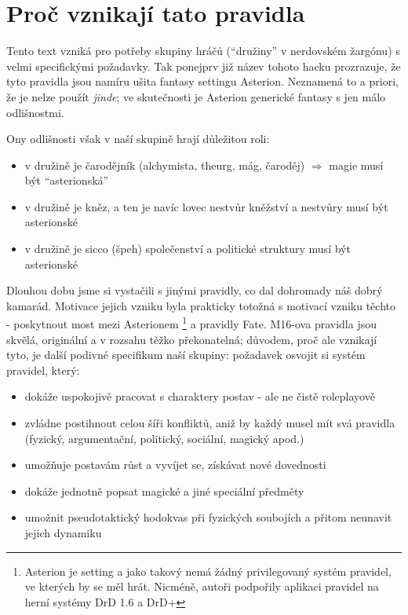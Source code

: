 \documentclass[../main.tex]{subfiles}
\begin{document}
\section{Proč vznikají tato pravidla}
\label{sec:proc-pravidla}


Tento text vzniká pro potřeby skupiny hráčů (``družiny'' v nerdovském žargónu) s velmi specifickými požadavky. Tak ponejprv již název tohoto hacku prozrazuje, že tyto pravidla jsou namíru ušita fantasy settingu Asterion. Neznamená to a priori, že je nelze použít \textit{jinde}; ve skutečnosti je Asterion generické fantasy s jen málo odlišnostmi. 

Ony odlišnosti však v naší skupině hrají důležitou roli:

\begin{itemize}
\item v družině je čarodějník (alchymista, theurg, mág, čaroděj) $\Rightarrow$ magie musí být ``asterionská''
\item v družině je kněz, a ten je navíc lovec nestvůr \Rightarrow kněžství a nestvůry musí být asterionské
\item v družině je sicco (špeh) \Rightarrow společenství a politické struktury musí být asterionské
\end{itemize}

Dlouhou dobu jsme si vystačili s jinými pravidly, co dal dohromady náš dobrý kamarád. Motivace jejich vzniku byla prakticky totožná s motivací vzniku těchto - poskytnout most mezi Asterionem \footnote{Asterion je setting a jako takový nemá žádný privilegovaný systém pravidel, ve kterých by se měl hrát. Nicméně, autoři podpořily aplikaci pravidel na herní systémy DrD 1.6 a DrD+} a pravidly Fate. M16-ova pravidla jsou skvělá, originální a v rozsahu těžko překonatelná; důvodem, proč ale vznikají tyto, je další podivné specifikum naší skupiny: požadavek osvojit si systém pravidel, který:

\begin{itemize}
\item dokáže uspokojivě pracovat s charaktery postav - ale ne čistě roleplayově
\item zvládne postihnout celou šíři konfliktů, aniž by každý musel mít svá pravidla (fyzický, argumentační, politický, sociální, magický apod.)
\item umožňuje postavám růst a vyvíjet se, získávat nové dovednosti
\item dokáže jednotně popsat magické a jiné speciální předměty
\item umožnit pseudotaktický hodokvas při fyzických soubojích a přitom neunavit jejich dynamiku
\end{itemize}
\end{document}
